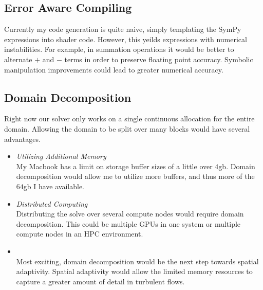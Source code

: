 \subsection{Error Aware Compiling}
Currently my code generation is quite naive, simply
templating the SymPy expressions into shader code.
However, this yeilds expressions with numerical instabilities.
For example, in summation operations it would be better to alternate
$+$ and $-$ terms in order to preserve floating point accuracy.
Symbolic manipulation improvements could lead to greater numerical 
accuracy.

\subsection{Domain Decomposition}
Right now our solver only works on a single continuous allocation
for the entire domain.
Allowing the domain to be split over many blocks would have several 
advantages.
\begin{itemize}
\item \textit{Utilizing Additional Memory } \\
My Macbook has a limit on storage buffer sizes of a little over $4$gb.
Domain decomposition would allow me to utilize more buffers, and thus more of the $64$gb I have available.

\item \textit{Distributed Computing} \\
Distributing the solve over several compute nodes would require 
domain decomposition. 
This could be multiple GPUs in one system or
multiple compute nodes in an HPC environment.

\item {} \\
Most exciting, domain decomposition would be 
the next step towards spatial adaptivity. 
Spatial adaptivity would allow the limited memory resources to
capture a greater amount of detail in turbulent flows.
\end{itemize}

